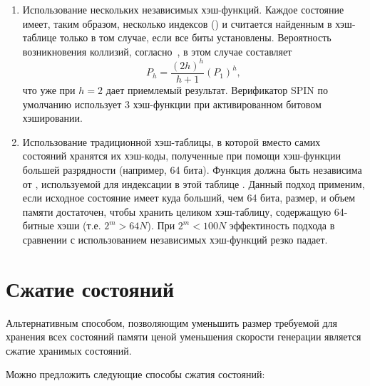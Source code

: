 \begin{enumerate}
\item Использование нескольких независимых хэш-функций. Каждое
  состояние имеет, таким образом, несколько индексов () и считается
  найденным в хэш-таблице только в том случае, если все биты
   установлены. Вероятность возникновения
  коллизий, согласно~\cite{BitHash1}, в этом случае составляет
  \begin{equation}
    \label{eq:bithash-multi-coll}
    P_h = \frac{(2 h)^h}{h+1} (P_1)^h,
  \end{equation}
  что уже при $h = 2$ дает приемлемый результат. Верификатор SPIN по
  умолчанию использует 3 хэш-функции при активированном битовом
  хэшировании.

\item Использование традиционной хэш-таблицы, в которой вместо самих
  состояний хранятся их хэш-коды, полученные при помощи хэш-функции
   большей разрядности (например, 64 бита). Функция 
  должна быть независима от , используемой для индексации в этой
  таблице \cite{BitHash1}. Данный подход применим, если исходное
  состояние имеет куда больший, чем 64 бита, размер, и объем памяти
  достаточен, чтобы хранить целиком хэш-таблицу, содержащую 64-битные
  хэши (т.е. $2^m > 64 N$). При $2^m < 100 N$ эффектиность подхода в
  сравнении с использованием независимых хэш-функций резко падает.
\end{enumerate}

\section{Сжатие состояний}
\label{sec:state-compression}


Альтернативным способом, позволяющим уменьшить размер требуемой для
хранения всех состояний памяти ценой уменьшения скорости генерации
является сжатие хранимых состояний. 

Можно предложить следующие способы сжатия состояний:

